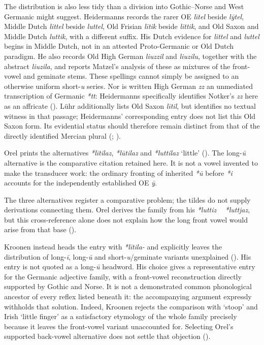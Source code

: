 \documentclass[
  british,
  a4paper,
]{article}
\providecommand{\Recon}[1]{\emph{*#1}}
\begin{document}
The distribution is also less tidy than a division into Gothic--Norse
and West Germanic might suggest. Heidermanns records the rarer OE
\emph{lītel} beside \emph{lȳtel}, Middle Dutch \emph{littel} beside
\emph{luttel}, Old Frisian \emph{lītik} beside \emph{littik}, and Old
Saxon and Middle Dutch \emph{luttik}, with a different suffix. His Dutch
evidence for \emph{littel} and \emph{luttel} begins in Middle Dutch, not
in an attested Proto-Germanic or Old Dutch paradigm. He also records Old
High German \emph{liuzzil} and \emph{liuzilu}, together with the
abstract \emph{liuzila}, and reports Matzel's analysis of these as
mixtures of the front-vowel and geminate stems. These spellings cannot
simply be assigned to an otherwise uniform short-\emph{u} series. Nor is
written High German \emph{zz} an unmediated transcription of Germanic
\emph{*tt}: Heidermanns specifically identifies Notker's \emph{zz} here
as an affricate (). Lühr additionally lists Old Saxon \emph{lītil}, but
identifies no textual witness in that passage; Heidermanns'
corresponding entry does not list this Old Saxon form. Its evidential
status should therefore remain distinct from that of the directly
identified Mercian plural (;
).

Orel prints the alternatives \Recon{lītilaz}, \Recon{lūtilaz} and
\Recon{luttilaz} `little' (). The
long-\emph{ū} alternative is the comparative citation retained here. It
is not a vowel invented to make the transducer work: the ordinary
fronting of inherited \emph{*ū} before \emph{*i} accounts for the
independently established OE \emph{ȳ}.

The three alternatives register a comparative problem; the tildes do not
supply derivations connecting them. Orel derives the family from his
\emph{*luttiz ~ *luttjaz}, but this cross-reference alone does not
explain how the long front vowel would arise from that base
().

Kroonen instead heads the entry with \Recon{lītila-} and explicitly
leaves the distribution of long-\emph{ī}, long-\emph{ū} and
short-\emph{u}/geminate variants unexplained
(). His entry is not quoted
as a long-\emph{ū} headword. His choice gives a representative entry for
the Germanic adjective family, with a front-vowel reconstruction
directly supported by Gothic and Norse. It is not a demonstrated common
phonological ancestor of every reflex listed beneath it: the
accompanying argument expressly withholds that solution. Indeed, Kroonen
rejects the comparison with `stoop' and Irish `little finger' as a
satisfactory etymology of the whole family precisely because it leaves
the front-vowel variant unaccounted for. Selecting Orel's supported
back-vowel alternative does not settle that objection
().
\end{document}
